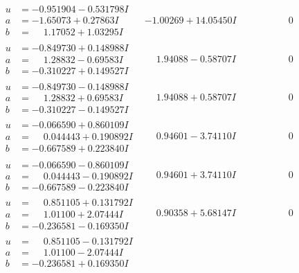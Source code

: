 \documentclass[1p]{elsarticle_modified}
\theoremstyle{definition}
\begin{document}
$$\begin{array}{c|c|c}
\begin{aligned}
u &= -0.951904 - 0.531798 I \\
a &= -1.65073 + 0.27863 I \\
b &= \phantom{-}1.17052 + 1.03295 I\end{aligned}
 & -1.00269 + 14.05450 I & \phantom{-0.000000 } 0 \\ \hline\begin{aligned}
u &= -0.849730 + 0.148988 I \\
a &= \phantom{-}1.28832 - 0.69583 I \\
b &= -0.310227 + 0.149527 I\end{aligned}
 & \phantom{-}1.94088 - 0.58707 I & \phantom{-0.000000 } 0 \\ \hline\begin{aligned}
u &= -0.849730 - 0.148988 I \\
a &= \phantom{-}1.28832 + 0.69583 I \\
b &= -0.310227 - 0.149527 I\end{aligned}
 & \phantom{-}1.94088 + 0.58707 I & \phantom{-0.000000 } 0 \\ \hline\begin{aligned}
u &= -0.066590 + 0.860109 I \\
a &= \phantom{-}0.044443 + 0.190892 I \\
b &= -0.667589 + 0.223840 I\end{aligned}
 & \phantom{-}0.94601 - 3.74110 I & \phantom{-0.000000 } 0 \\ \hline\begin{aligned}
u &= -0.066590 - 0.860109 I \\
a &= \phantom{-}0.044443 - 0.190892 I \\
b &= -0.667589 - 0.223840 I\end{aligned}
 & \phantom{-}0.94601 + 3.74110 I & \phantom{-0.000000 } 0 \\ \hline\begin{aligned}
u &= \phantom{-}0.851105 + 0.131792 I \\
a &= \phantom{-}1.01100 + 2.07444 I \\
b &= -0.236581 - 0.169350 I\end{aligned}
 & \phantom{-}0.90358 + 5.68147 I & \phantom{-0.000000 } 0 \\ \hline\begin{aligned}
u &= \phantom{-}0.851105 - 0.131792 I \\
a &= \phantom{-}1.01100 - 2.07444 I \\
b &= -0.236581 + 0.169350 I\end{aligned}

\end{array}$$
\end{document}
